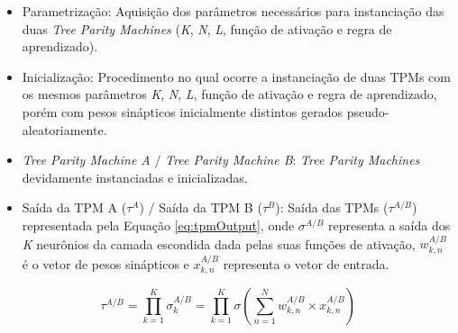\documentclass[12pt]{article}
\begin{document}
        \begin{itemize}
            \item Parametrização:
            Aquisição dos parâmetros necessários para instanciação das duas \textit{Tree Parity Machines} (\textit{K}, \textit{N}, \textit{L}, função de ativação e regra de aprendizado).
                
            \item Inicialização:
            Procedimento no qual ocorre a instanciação de duas TPMs com os mesmos parâmetros \textit{K}, \textit{N}, \textit{L}, função de ativação e regra de aprendizado, porém com pesos sinápticos inicialmente distintos gerados pseudo-aleatoriamente.
                
            \item \textit{Tree Parity Machine A} / \textit{Tree Parity Machine B}:
            \textit{Tree Parity Machines} devidamente instanciadas e inicializadas.
                
            \item Saída da TPM A ($\tau^A$) / Saída da TPM B ($\tau^B$):
            Saída das TPMs ($\tau^{A/B}$) representada pela Equação \eqref{eq:tpmOutput}, onde $\sigma^{A/B}$ representa a saída dos \textit{K} neurônios da camada escondida dada pelas suas funções de ativação, $w^{A/B}_{k,n}$ é o vetor de pesos sinápticos e $x^{A/B}_{k,n}$ representa o vetor de entrada.
            
        \end{itemize}
        
        \begin{equation}
            \label{eq:tpmOutput}
            \tau^{A/B} = \displaystyle\prod_{k=1}^{K} \sigma_{k}^{A/B} = \displaystyle\prod_{k=1}^{K} \sigma \left (\displaystyle\sum_{n=1}^{N} w_{k,n}^{A/B} \times x_{k,n}^{A/B} \right )
        \end{equation}
    
\end{document}
